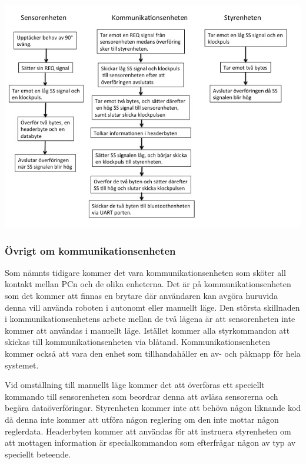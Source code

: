 \includegraphics[angle=0,scale=0.5]{bilder/Schema_exempel.png}

\subsubsection{Övrigt om kommunikationsenheten}

Som nämnts tidigare kommer det vara kommunikationsenheten som sköter all kontakt mellan PCn och de olika enheterna. Det är på kommunikationsenheten som det kommer att finnas en brytare där användaren kan avgöra huruvida denna vill använda roboten i autonomt eller manuellt läge. Den största skillnaden i kommunikationsenhetens arbete mellan de två lägena är att sensorenheten inte kommer att användas i manuellt läge. Istället kommer alla styrkommandon att skickas till kommunikationsenheten via blåtand. Kommunikationsenheten kommer också att vara den enhet som tillhandahåller en av- och påknapp för hela systemet.

Vid omställning till manuellt läge kommer det att överföras ett speciellt kommando till sensorenheten som beordrar denna att avläsa sensorerna och begära dataöverföringar. Styrenheten kommer inte att behöva någon liknande kod då denna inte kommer att utföra någon reglering om den inte mottar någon reglerdata. Headerbyten kommer att användas för att instruera styrenheten om att mottagen information är specialkommandon som efterfrågar någon av typ av speciellt beteende.

